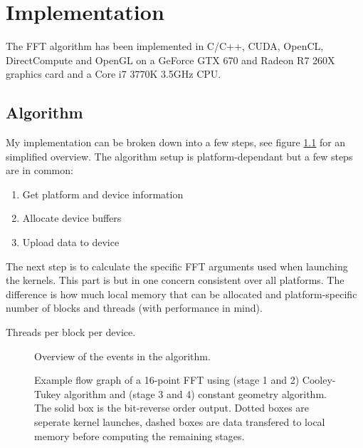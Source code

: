 \chapter{Implementation}
%
The FFT algorithm has been implemented in C/C++, CUDA, OpenCL, DirectCompute and OpenGL on a GeForce GTX 670 and Radeon R7 260X graphics card and a Core i7 3770K 3.5GHz CPU.

\section{Algorithm}
My implementation can be broken down into a few steps, see figure \ref{fig:algorithm-overview} for an simplified overview. The algorithm setup is platform-dependant but a few steps are in common:
\begin{enumerate}
	\item Get platform and device information
	\item Allocate device buffers
	\item Upload data to device
\end{enumerate}	
The next step is to calculate the specific FFT arguments used when launching the kernels. This part is but in one concern consistent over all platforms. The difference is how much local memory that can be allocated and platform-specific number of blocks and threads (with performance in mind).
\begin{table}
	\centering	
	
	\caption{Threads per block per device.}
	\label{tab:threads-per-block}
\end{table}
\begin{figure}[h]
	\centering
	
	\caption{Overview of the events in the algorithm.}
	\label{fig:algorithm-overview}
\end{figure}
\begin{figure}
	
	\caption{Example flow graph of a 16-point FFT using (stage 1 and 2) Cooley-Tukey algorithm and (stage 3 and 4) constant geometry algorithm. The solid box is the bit-reverse order output. Dotted boxes are seperate kernel launches, dashed boxes are data transfered to local memory before computing the remaining stages.}
\end{figure}